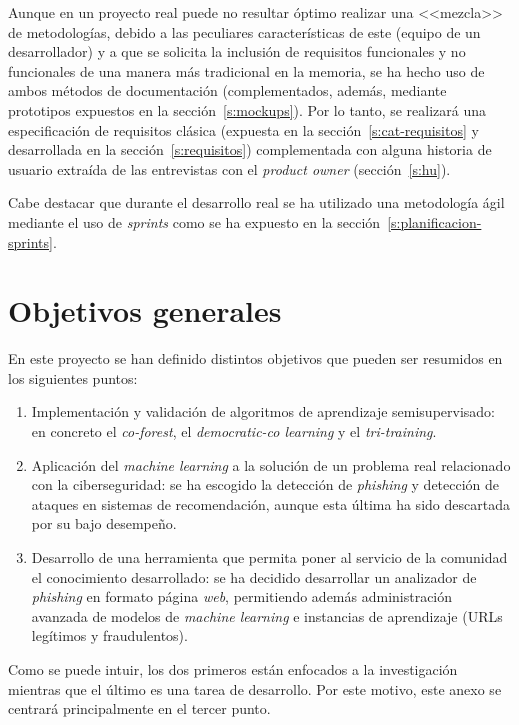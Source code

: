 Aunque en un proyecto real puede no resultar óptimo realizar una <<mezcla>> de metodologías, debido a las peculiares características de este (equipo de un desarrollador) y a que se solicita la inclusión de requisitos funcionales y no funcionales de una manera más tradicional en la memoria, se ha hecho uso de ambos métodos de documentación (complementados, además, mediante prototipos expuestos en la sección~\ref{s:mockups}). Por lo tanto, se realizará una especificación de requisitos clásica (expuesta en la sección~\ref{s:cat-requisitos} y desarrollada en la sección~\ref{s:requisitos}) complementada con alguna historia de usuario extraída de las entrevistas con el \textit{product owner} (sección~\ref{s:hu}).

Cabe destacar que durante el desarrollo real se ha utilizado una metodología ágil mediante el uso de \textit{sprints} como se ha expuesto en la sección~\ref{s:planificacion-sprints}.

\section{Objetivos generales}

En este proyecto se han definido distintos objetivos que pueden ser resumidos en los siguientes puntos:

\begin{enumerate}
	\item Implementación y validación de algoritmos de aprendizaje semisupervisado: en concreto el \textit{co-forest}, el \textit{democratic-co learning} y el \textit{tri-training}.
	\item Aplicación del \textit{machine learning} a la solución de un problema real relacionado con la ciberseguridad: se ha escogido la detección de \textit{phishing} y detección de ataques en sistemas de recomendación, aunque esta última ha sido descartada por su bajo desempeño.
	\item Desarrollo de una herramienta que permita poner al servicio de la comunidad el conocimiento desarrollado: se ha decidido desarrollar un analizador de \textit{phishing} en formato página \textit{web}, permitiendo además administración avanzada de modelos de \textit{machine learning} e instancias de aprendizaje (URLs legítimos y fraudulentos).
\end{enumerate}

Como se puede intuir, los dos primeros están enfocados a la investigación mientras que el último es una tarea de desarrollo. Por este motivo, este anexo se centrará principalmente en el tercer punto.

